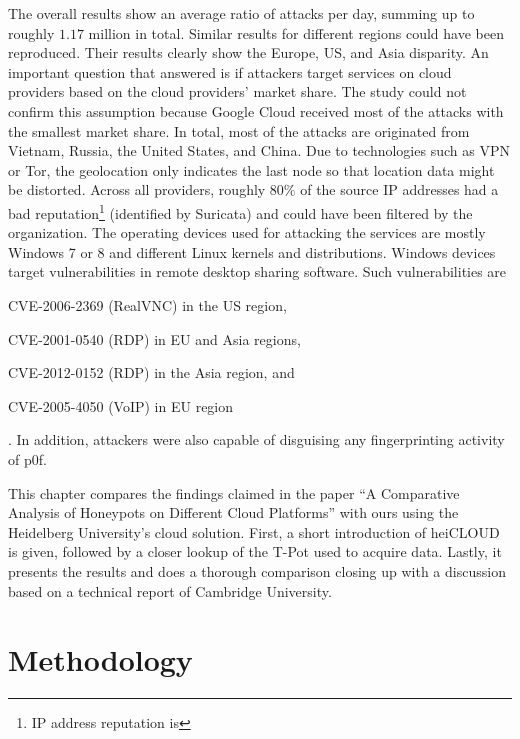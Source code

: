 The overall results show an average ratio of  attacks per day, summing up to roughly $1.17$ million in total.
Similar results for different regions could have been reproduced.
Their results clearly show the Europe, US, and Asia disparity.
An important question that \citet{Kelly2021} answered is if attackers target services on cloud providers based on the cloud providers' market share.
The study could not confirm this assumption because Google Cloud received most of the attacks with the smallest market share.
In total, most of the attacks are originated from Vietnam, Russia, the United States, and China.
Due to technologies such as VPN or Tor, the geolocation only indicates the last node so that location data might be distorted.
Across all providers, roughly $80\%$ of the source IP addresses had a bad reputation\footnote{IP address reputation is} (identified by Suricata) and could have been filtered by the organization.
The operating devices used for attacking the services are mostly Windows 7 or 8 and different Linux kernels and distributions.
Windows devices target vulnerabilities in remote desktop sharing software.
Such vulnerabilities are
\begin{enumerate*}[label=(\roman*)]
    \item CVE-2006-2369\cite{CVE-2006-2369} (RealVNC) in the US region,
    \item CVE-2001-0540\cite{CVE-2001-0540} (RDP) in EU and Asia regions,
    \item CVE-2012-0152\cite{CVE-2012-0152} (RDP) in the Asia region, and
    \item CVE-2005-4050\cite{CVE-2005-4050} (VoIP) in EU region
\end{enumerate*}.
In addition, attackers were also capable of disguising any fingerprinting activity of p0f.

This chapter compares the findings \citet{Kelly2021} claimed in the paper \enquote{A Comparative Analysis of Honeypots on Different Cloud Platforms} with ours using the Heidelberg University's cloud solution.
First, a short introduction of heiCLOUD is given, followed by a closer lookup of the T-Pot used to acquire data.
Lastly, it presents the results and does a thorough comparison closing up with a discussion based on a technical report of Cambridge University.

\section{Methodology}

